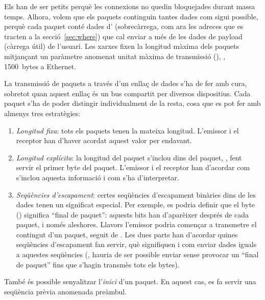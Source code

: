 Els  han de ser petits perquè les connexions no quedin bloquejades durant massa temps. 
Alhora, volem que els paquets continguin tantes dades com sigui possible, perquè cada paquet 
conté dades d' (sobrecàrrega, com ara les adreces que es tracten a la secció~\ref{sec:where}) que cal
enviar a més de les dades de payload (càrrega útil) de l'usuari. Les xarxes fixen la longitud màxima dels paquets
mitjançant un paràmetre anomenat unitat màxima de transmissió (), \eg, 1500~bytes a Ethernet.


La transmissió de paquets a través d'un enllaç de dades s'ha de fer amb cura,
sobretot quan aquest enllaç és un bus compartit per diversos dispositius.
Cada paquet s'ha de poder distingir individualment de la resta, 
cosa que es pot fer amb almenys tres estratègies:
\begin{enumerate}
\item \textit{Longitud fixa}: tots els paquets tenen la mateixa longitud. L'emissor i el receptor han
d'haver acordat aquest valor per endavant.

\item \textit{Longitud explícita}: la longitud del paquet s'inclou dins del paquet, \eg, 
fent servir el primer byte del paquet. L'emissor i el receptor han d'acordar com s'inclou aquesta informació
i com s'ha d'interpretar.

\item \textit{Seqüències d'escapament}: certes seqüències d'escapament binàries 
dins de les dades tenen un significat especial. 
Per exemple, es podria definir que el byte  () 
significa ``final de paquet'': aquests bits han d'aparèixer després de cada paquet, i només aleshores.
% 
Llavors l'emissor podria començar a transmetre el contingut d'un paquet, seguit de .
Les dues parts han d'acordar quines seqüències d'escapament fan servir, què signifiquen i com 
enviar dades iguals a aquestes seqüències (\eg, hauria de ser possible enviar 
sense provocar un ``final de paquet'' fins que s'hagin transmès tots els bytes).
\end{enumerate}

\begin{remark}
També és possible senyalitzar l'\textit{inici} d'un paquet. En aquest cas, es fa servir una seqüència prèvia anomenada preàmbul.
\end{remark}


